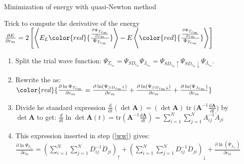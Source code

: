 \begin{frame}{Minimization of energy with quasi-Newton method}

	\begin{scriptsize}
		\begin{alertblock}{Trick to compute the derivative of the energy}
			{\color{red}{Goal:}}\\
			$\frac{\partial E}{\partial c_m} = 2\left[\left\langle E_L {\color{red}{\frac{\frac{\partial \Psi_{T_{c_m}}}{\partial c_m}}{\Psi_{T_{c_m}}}}}\right\rangle - E \left\langle {\color{red}{\frac{\frac{\partial \Psi_{T_{c_m}}}{\partial c_m}}{\Psi_{T_{c_m}}}}}\right\rangle \right]$ 
			
			\begin{enumerate}
				\item  Split the trial wave function: $\Psi_{T_{c_m}} = \Psi_{{SD}_{c_m}} \Psi_{{J}_{c_m}} = \Psi_{{SD}_{c_m} \uparrow}  \Psi_{{SD}_{c_m} \downarrow} \Psi_{{J}_{c_m}} $.
				
				\item Rewrite the {\color{red}{derivatives}} as:  $\color{red}{\frac{\partial \ln \Psi_{T_{c_m}}}{\partial c_m} = \frac{\partial \ln(\Psi_{{SD_{c_m}}\uparrow})}{\partial c_m} + \frac{\partial \ln(\Psi_{{SD}_{c_m}\downarrow})}{\partial c_m}  + \frac{\partial \ln(\Psi_{J_{c_m}})}{\partial c_m}}$\label{ww}
				
				\item Divide he standard expression $\frac{\mathrm d}{\mathrm dt}(\det\mathbf A)=(\det\mathbf A)\mathop{\textrm{tr}}\biggl(\mathbf A^{-1}\frac{\mathrm d\mathbf A}{\mathrm dt}\biggr)$ by $\det\mathbf A$ to get: $\frac{d}{dt}\ln\det \mathbf A(t) = \mathrm{tr} \left(\mathbf A^{-1} \frac{d \mathbf{A}}{dt}\right) = \sum_{i=1}^{N} \sum_{j=1}^{N} A^{-1}_{ij} \dot{A}_{ji}$
				
				\item This expression inserted in step (\ref{ww}) gives:
				$\boxed{\frac{\partial \ln \Psi_{T_{c_m}}}{\partial c_m} = (\sum_{i=1}^{N} \sum_{j=1}^{N} D_{ij}^{-1} \dot{D}_{ji})_{\uparrow} + (\sum_{i=1}^{N} \sum_{j=1}^{N} D_{ij}^{-1} \dot{D}_{ji})_{\downarrow} + \frac{\partial \ln(\Psi_{J_{c_m}})}{\partial c_m}}$
			\end{enumerate}
		\end{alertblock}
	\end{scriptsize}

\end{frame}





